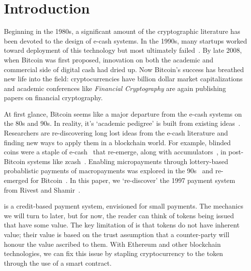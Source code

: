 

\section{Introduction}

Beginning in the 1980s, a significant amount of the cryptographic literature has been devoted to the design of e-cash systems. In the 1990s, many startups worked toward deployment of this technology but most ultimately failed~\cite{NBFMG16}. By late 2008, when Bitcoin was first proposed, innovation on both the academic and commercial side of digital cash had dried up. Now Bitcoin's success has breathed new life into the field: cryptocurrencies have billion dollar market capitalizations and academic conferences like \textit{Financial Cryptography} are again publishing papers on financial cryptography. 

At first glance, Bitcoin seems like a major departure from the e-cash systems on the 80s and 90s. In reality, it's `academic pedigree' is built from existing ideas~\cite{NaCl17}. Researchers are re-discovering long lost ideas from the e-cash literature and finding new ways to apply them in a blockchain world. For example, blinded coins were a staple of e-cash~\cite{Cha82} that re-emerge, along with accumulators~\cite{SaTa99}, in post-Bitcoin systems like zcash~\cite{MGGR13,SCG+14}. Enabling micropayments through lottery-based probablistic payments of macropayments was explored in the 90s~\cite{Riv97,Whe97,JaOd97} and re-emerged for Bitcoin~\cite{Pash15}. In this paper, we `re-discover' the 1997 payment system \pw from Rivest and Shamir~\cite{RS96}. 

\pw is a credit-based payment system, envisioned for small payments. The mechanics we will turn to later, but for now, the reader can think of tokens being issued that have some value. The key limitation of \pw is that tokens do not have inherent value; their value is based on the trust assumption that a counter-party will honour the value ascribed to them. With Ethereum and other blockchain technologies, we can fix this issue by stapling cryptocurrency to the token through the use of a smart contract. 

